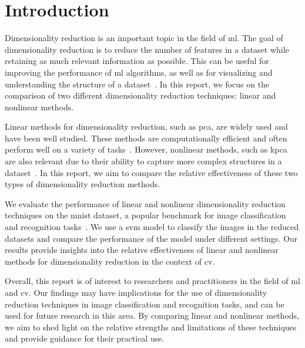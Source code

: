 \chapter{Introduction}\label{cha:introduction}
Dimensionality reduction is an important topic in the field of \gls{ml}. The goal of dimensionality reduction is to reduce the number of features in a dataset while retaining as much relevant information as possible. This can be useful for improving the performance of \gls{ml} algorithms, as well as for visualizing and understanding the structure of a dataset~\cite{dimensionality-reduction-cheng}. In this report, we focus on the comparison of two different dimensionality reduction techniques: linear and nonlinear methods.

Linear methods for dimensionality reduction, such as \gls{pca}, are widely used and have been well studied. These methods are computationally efficient and often perform well on a variety of tasks~\cite{james-statistical-learning1}. However, nonlinear methods, such as \gls{kpca} are also relevant due to their ability to capture more complex structures in a dataset~\cite{dimensionality-reduction-cheng}. In this report, we aim to compare the relative effectiveness of these two types of dimensionality reduction methods.

We evaluate the performance of linear and nonlinear dimensionality reduction techniques on the \gls{mnist} dataset, a popular benchmark for image classification and recognition tasks~\cite{lecun-mnist-database}. We use a \gls{svm} model to classify the images in the reduced datasets and compare the performance of the model under different settings. Our results provide insights into the relative effectiveness of linear and nonlinear methods for dimensionality reduction in the context of \gls{cv}.

Overall, this report is of interest to researchers and practitioners in the field of \gls{ml} and \gls{cv}. Our findings may have implications for the use of dimensionality reduction techniques in image classification and recognition tasks, and can be used for future research in this area. By comparing linear and nonlinear methods, we aim to shed light on the relative strengths and limitations of these techniques and provide guidance for their practical use.




